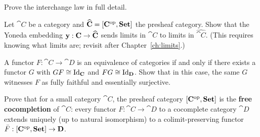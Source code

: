 \begin{exercise}
Prove the interchange law in full detail.
\end{exercise}

\begin{exercise}[$\star$]
Let $\cat{C}$ be a category and $\widehat{\mathbf{C}} = [\mathbf{C}^{\mathrm{op}}, \mathbf{Set}]$ the presheaf category. Show that the Yoneda embedding $\mathbf{y}: \mathbf{C} \to \widehat{\mathbf{C}}$ sends limits in $\cat{C}$ to limits in $\widehat{\cat{C}}$. (This requires knowing what limits are; revisit after Chapter~\ref{ch:limits}.)
\end{exercise}

\begin{exercise}[$\star$]
A functor $F: \cat{C} \to \cat{D}$ is an equivalence of categories if and only if there exists a functor $G$ with $GF \cong \mathrm{Id}_{\mathbf{C}}$ and $FG \cong \mathrm{Id}_{\mathbf{D}}$. Show that in this case, the same $G$ witnesses $F$ as fully faithful and essentially surjective.
\end{exercise}

\begin{exercise}[$\star\star$]
Prove that for a small category $\cat{C}$, the presheaf category $[\mathbf{C}^{\mathrm{op}}, \mathbf{Set}]$ is the \textbf{free cocompletion} of $\cat{C}$: every functor $F: \cat{C} \to \cat{D}$ to a cocomplete category $\cat{D}$ extends uniquely (up to natural isomorphism) to a colimit-preserving functor $\bar{F}: [\mathbf{C}^{\mathrm{op}},\mathbf{Set}] \to \mathbf{D}$.
\end{exercise}
